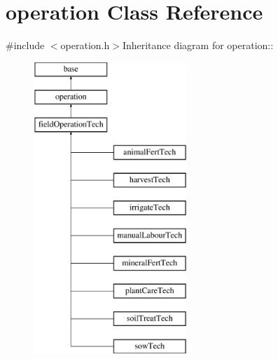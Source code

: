 \hypertarget{classoperation}{
\section{operation Class Reference}
\label{classoperation}
}


{\ttfamily \#include $<$operation.h$>$}Inheritance diagram for operation::\begin{figure}[H]
\begin{center}
\leavevmode
\includegraphics[height=11cm]{classoperation}
\end{center}
\end{figure}
